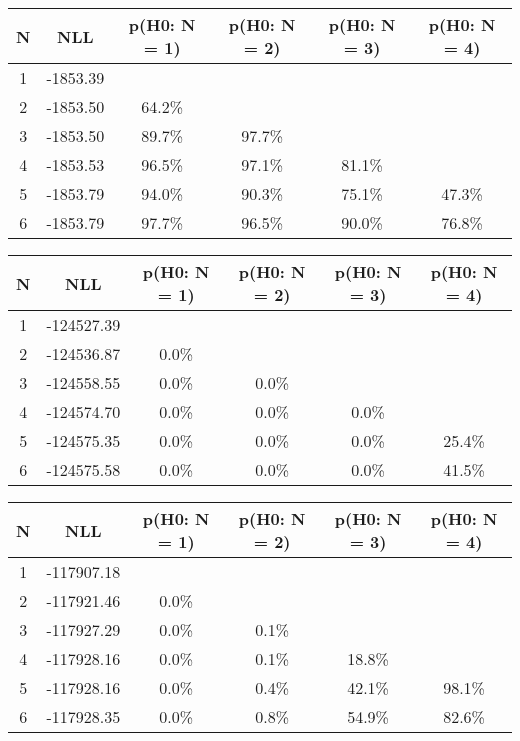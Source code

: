 \begin{table}[htb]
	\begin{center}
{\footnotesize\renewcommand{\arraystretch}{1.4}
		\begin{tabular}{cc||cccc}
			N & NLL & p(H0: N = 1) & p(H0: N = 2) & p(H0: N = 3) & p(H0: N = 4)\\ 
		\hline
1 & -1853.39 & & & & \\
2 & -1853.50 & 64.2\% & & & \\
3 & -1853.50 & 89.7\% & 97.7\% & & \\
4 & -1853.53 & 96.5\% & 97.1\% & 81.1\% & \\
5 & -1853.79 & 94.0\% & 90.3\% & 75.1\% & 47.3\% \\
6 & -1853.79 & 97.7\% & 96.5\% & 90.0\% & 76.8\% \\
	\end{tabular}
		\label{tab:lab}
	}
	\end{center}\end{table}

\begin{table}[htb]
	\begin{center}
{\footnotesize\renewcommand{\arraystretch}{1.4}
		\begin{tabular}{cc||cccc}
			N & NLL & p(H0: N = 1) & p(H0: N = 2) & p(H0: N = 3) & p(H0: N = 4)\\ 
		\hline
1 & -124527.39 & & & & \\
2 & -124536.87 & 0.0\% & & & \\
3 & -124558.55 & 0.0\% & 0.0\% & & \\
4 & -124574.70 & 0.0\% & 0.0\% & 0.0\% & \\
5 & -124575.35 & 0.0\% & 0.0\% & 0.0\% & 25.4\% \\
6 & -124575.58 & 0.0\% & 0.0\% & 0.0\% & 41.5\% \\
	\end{tabular}
		\label{tab:lab}
	}
	\end{center}\end{table}

\begin{table}[htb]
	\begin{center}
{\footnotesize\renewcommand{\arraystretch}{1.4}
		\begin{tabular}{cc||cccc}
			N & NLL & p(H0: N = 1) & p(H0: N = 2) & p(H0: N = 3) & p(H0: N = 4)\\ 
		\hline
1 & -117907.18 & & & & \\
2 & -117921.46 & 0.0\% & & & \\
3 & -117927.29 & 0.0\% & 0.1\% & & \\
4 & -117928.16 & 0.0\% & 0.1\% & 18.8\% & \\
5 & -117928.16 & 0.0\% & 0.4\% & 42.1\% & 98.1\% \\
6 & -117928.35 & 0.0\% & 0.8\% & 54.9\% & 82.6\% \\
	\end{tabular}
		\label{tab:lab}
	}
	\end{center}\end{table}

